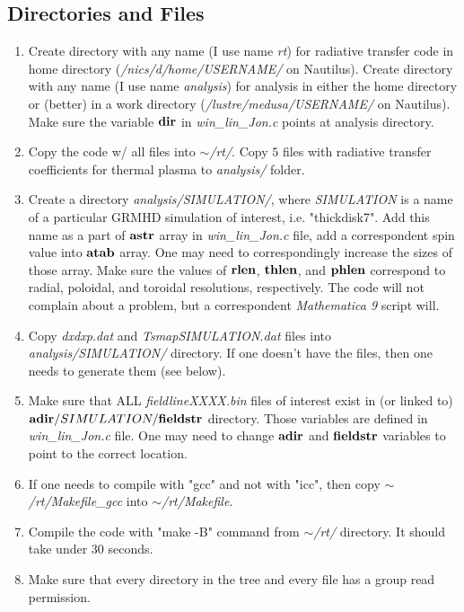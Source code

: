 \documentclass{emulateapj}
\newcommand{\mat}{\textit{Mathematica 9 }}
\begin{document}
\subsection{Directories and Files}
\begin{enumerate}
\item{Create directory with any name (I use name \textit{rt}) for radiative transfer code in home directory (\textit{/nics/d/home/USERNAME/} on Nautilus).
Create directory with any name (I use name \textit{analysis}) for analysis in either the home directory or (better) in a work directory (\textit{/lustre/medusa/USERNAME/} on Nautilus).
Make sure the variable ${\bf dir}$ in \textit{win\_lin\_Jon.c} points at analysis directory.}
\item{Copy the code w/ all files into \textit{$\sim$/rt/}. Copy $5$ files with radiative transfer coefficients for thermal plasma to \textit{analysis/} folder.}
\item{Create a directory \textit{analysis/SIMULATION/}, where \textit{SIMULATION} is a name of a particular GRMHD simulation of interest, i.e. "thickdisk7".
Add this name as a part of ${\bf astr}$ array in \textit{win\_lin\_Jon.c} file, add a correspondent spin value into ${\bf atab}$ array.
One may need to correspondingly increase the sizes of those array. Make sure the values of ${\bf rlen}$, ${\bf thlen}$, and ${\bf phlen}$ correspond to radial,
poloidal, and toroidal resolutions, respectively. The code will not complain about a problem, but a correspondent \mat script will.}
\item{Copy \textit{dxdxp.dat} and \textit{TsmapSIMULATION.dat} files into \textit{analysis/SIMULATION/} directory. If one doesn't have the files,
then one needs to generate them (see below).}
\item{Make sure that ALL \textit{fieldlineXXXX.bin} files of interest exist in (or linked to) ${\bf adir}/SIMULATION/{\bf fieldstr}$ directory.
Those variables are defined in \textit{win\_lin\_Jon.c} file. One may need to change ${\bf adir}$ and ${\bf fieldstr}$ variables to point to the correct location.}
\item{If one needs to compile with "gcc" and not with "icc", then copy \textit{$\sim$/rt/Makefile\_gcc} into \textit{$\sim$/rt/Makefile}.}
\item{Compile the code with "make -B" command from \textit{$\sim$/rt/} directory. It should take under 30 seconds.}
\item{Make sure that every directory in the tree and every file has a group read permission.}
\end{enumerate}
\end{document}
